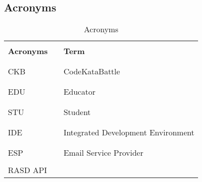 \subsection{Acronyms}
\begin{table}[H]
    \centering
    \renewcommand{\arraystretch}{0.5}
    \begin{tabular}{l l p{11cm}}
        \hline
                          &        &                                    \\
        \textbf{Acronyms} & \vline & \textbf{Term}                      \\
                          &        &                                    \\\hline & & \\
        CKB               & \vline & CodeKataBattle                     \\
                          &        &                                    \\\hline & & \\
        EDU               & \vline & Educator                           \\
                          &        &                                    \\\hline & & \\
        STU               & \vline & Student                            \\
                          &        &                                    \\\hline & & \\
        IDE               & \vline & Integrated Development Environment \\
                          &        &                                    \\\hline & & \\
        ESP               & \vline & Email Service Provider             \\
                          &        &                                    \\
        RASD
        API 
                          
        \hline
    \end{tabular}
    \caption{Acronyms}
\end{table}


